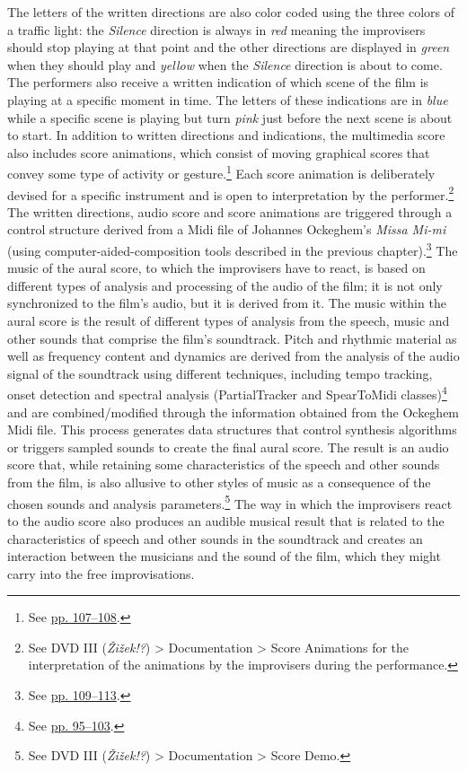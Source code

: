 The letters of the written directions are also color coded using the three colors of a traffic light: the \emph{Silence} direction is always in \emph{red} meaning the improvisers should stop playing at that point and the other directions are displayed in \emph{green} when they should play and \emph{yellow} when the \emph{Silence} direction is about to come. The performers also receive a written indication of which scene of the film is playing at a specific moment in time. The letters of these indications are in \emph{blue} while a specific scene is playing but turn \emph{pink} just before the next scene is about to start. In addition to written directions and indications, the multimedia score also includes score animations, which consist of moving graphical scores that convey some type of activity or gesture.\footnote{See \hyperlink{algoanimation}{pp. 107--108}.} Each score animation is deliberately devised for a specific instrument and is open to interpretation by the performer.\footnote{See DVD III (\emph{\v{Z}i\v{z}ek!?}) \tiny \textgreater \footnotesize \hspace{0pt} Documentation \tiny \textgreater \footnotesize \hspace{0pt} Score Animations for the interpretation of the animations by the improvisers during the performance.} The written directions, audio score and score animations are triggered through a control structure derived from a Midi file of Johannes Ockeghem's \emph{Missa Mi-mi} (using computer-aided-composition tools described in the previous chapter).\footnote{See \hyperlink{compueraided}{pp. 109--113}.} The music of the aural score, to which the improvisers have to react, is based on different types of analysis and processing of the audio of the film; it is not only synchronized to the film's audio, but it is derived from it. The music within the aural score is the result of different types of analysis from the speech, music and other sounds that comprise the film's soundtrack. Pitch and rhythmic material as well as frequency content and dynamics are derived from the analysis of the audio signal of the soundtrack using different techniques, including tempo tracking, onset detection and spectral analysis (PartialTracker and SpearToMidi classes)\footnote{See \hyperlink{spectrack}{pp. 95--103}.} and are combined/modified through the information obtained from the Ockeghem Midi file. This process generates data structures that control synthesis algorithms or triggers sampled sounds to create the final aural score. The result is an audio score that, while retaining some characteristics of the speech and other sounds from the film, is also allusive to other styles of music as a consequence of the chosen sounds and analysis parameters.\footnote{See DVD III (\emph{\v{Z}i\v{z}ek!?}) \tiny \textgreater \footnotesize \hspace{0pt} Documentation \tiny \textgreater \footnotesize \hspace{0pt} Score Demo.} The way in which the improvisers react to the audio score also produces an audible musical result that is related to the characteristics of speech and other sounds in the soundtrack and creates an interaction between the musicians and the sound of the film, which they might carry into the free improvisations.

